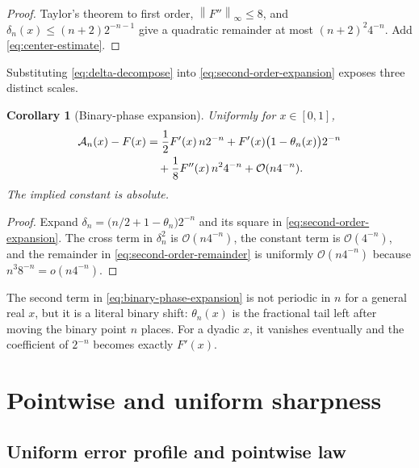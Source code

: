 \documentclass[11pt,oneside]{article}
\newtheorem{corollary}[theorem]{Corollary}
\theoremstyle{definition}
\theoremstyle{remark}
\newcommand{\bigO}{\mathcal O}
\newcommand{\norm}[1]{\left\lVert #1\right\rVert}
\begin{document}
\begin{proof}
Taylor's theorem to first order, $\norm{F''}_\infty\le8$, and
$\delta_n(x)\le(n+2)2^{-n-1}$ give a quadratic remainder at most
$(n+2)^2 4^{-n}$.  Add \eqref{eq:center-estimate}.
\end{proof}

Substituting \eqref{eq:delta-decompose} into
\eqref{eq:second-order-expansion} exposes three distinct scales.

\begin{corollary}[Binary-phase expansion]
\label{cor:binary-phase-expansion}
Uniformly for $x\in[0,1]$,
\begin{align}
 \mathcal A_n(x)-F(x)
 &=\frac12F'(x)\,n2^{-n}
   +F'(x)\bigl(1-\theta_n(x)\bigr)2^{-n} \notag\\
 &\quad+\frac18F''(x)\,n^2 4^{-n}
   +\bigO(n4^{-n}).                                       \label{eq:binary-phase-expansion}
\end{align}
The implied constant is absolute.
\end{corollary}

\begin{proof}
Expand
$\delta_n=\bigl(n/2+1-\theta_n\bigr)2^{-n}$ and its square in
\eqref{eq:second-order-expansion}.  The cross term in $\delta_n^2$ is
$\bigO(n4^{-n})$, the constant term is $\bigO(4^{-n})$, and the remainder in
\eqref{eq:second-order-remainder} is uniformly $\bigO(n4^{-n})$ because
$n^3 8^{-n}=o(n4^{-n})$.
\end{proof}

The second term in \eqref{eq:binary-phase-expansion} is not periodic in $n$ for
a general real $x$, but it is a literal binary shift: $\theta_n(x)$ is the
fractional tail left after moving the binary point $n$ places.  For a dyadic
$x$, it vanishes eventually and the coefficient of $2^{-n}$ becomes exactly
$F'(x)$.

\section{Pointwise and uniform sharpness}
\label{sec:sharpness}

\subsection{Uniform error profile and pointwise law}
\end{document}
